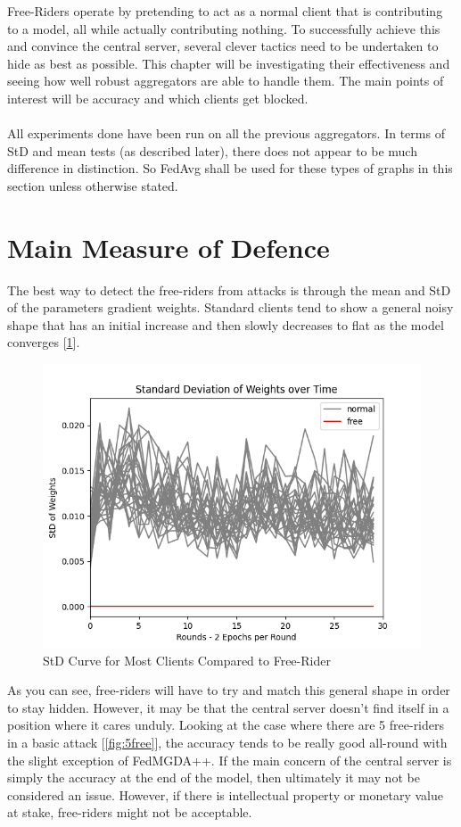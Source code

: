 Free-Riders operate by pretending to act as a normal client that is contributing to a model, all while actually contributing nothing.
To successfully achieve this and convince the central server, several clever tactics need to be undertaken to hide as best as possible.
This chapter will be investigating their effectiveness and seeing how well robust aggregators are able to handle them.
The main points of interest will be accuracy and which clients get blocked.
\\ \\
All experiments done have been run on all the previous aggregators. 
In terms of StD and mean tests (as described later), there does not appear to be much difference in distinction.
So FedAvg shall be used for these types of graphs in this section unless otherwise stated.

\section{Main Measure of Defence}
The best way to detect the free-riders from attacks is through the mean and StD of the parameters gradient weights.
Standard clients tend to show a general noisy shape that has an initial increase and then slowly decreases to flat as the model converges [\ref{fig:std_basic}].
\begin{figure}[htbp]
	\centering
    \includegraphics[scale=0.5]{free_riders/graphs/1_free.png}
	\caption{StD Curve for Most Clients Compared to Free-Rider}
	\label{fig:std_basic}
\end{figure}

As you can see, free-riders will have to try and match this general shape in order to stay hidden. 
However, it may be that the central server doesn't find itself in a position where it cares unduly.
Looking at the case where there are 5 free-riders in a basic attack [\ref{fig:5free}], the accuracy tends to be really good all-round with the slight exception of FedMGDA++.
If the main concern of the central server is simply the accuracy at the end of the model, then ultimately it may not be considered an issue.
However, if there is intellectual property or monetary value at stake, free-riders might not be acceptable.


